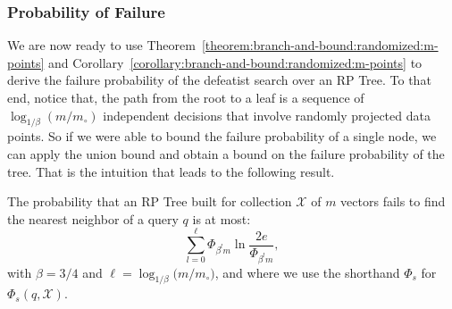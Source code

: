 \subsubsection{Probability of Failure}
We are now ready to use Theorem~\ref{theorem:branch-and-bound:randomized:m-points} and
Corollary~\ref{corollary:branch-and-bound:randomized:m-points} to derive the failure probability
of the defeatist search over an RP Tree.
To that end, notice that, the path from the root to a leaf is a sequence of $\log_{1/\beta} (m/m_\circ) $
independent decisions that involve randomly projected data points. So if we were able to bound the failure probability
of a single node, we can apply the union bound and obtain a bound on the failure probability of the tree.
That is the intuition that leads to the following result.

\begin{theorem}
    The probability that an RP Tree built for collection $\mathcal{X}$ of $m$ vectors fails to find the nearest neighbor
    of a query $q$ is at most:
    \begin{equation*}
        \sum_{l = 0}^{\ell} \Phi_{\beta^l m} \ln \frac{2e}{\Phi_{\beta^l m}},
    \end{equation*}
    with $\beta = 3/4$ and $\ell = \log_{1/\beta} \big( m / m_\circ \big)$, and where we use the shorthand
    $\Phi_s$ for $\Phi_s(q, \mathcal{X})$.
\end{theorem}
